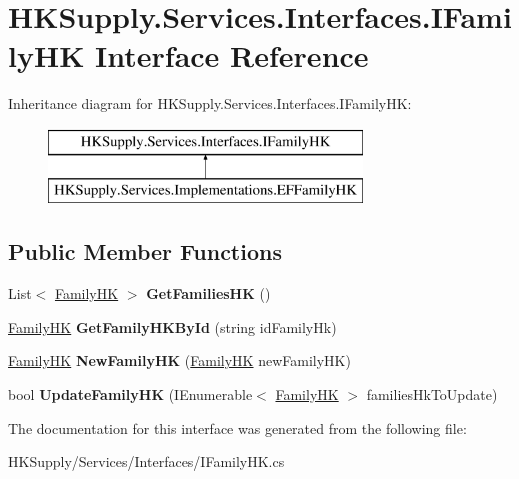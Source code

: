 \hypertarget{interface_h_k_supply_1_1_services_1_1_interfaces_1_1_i_family_h_k}{}\section{H\+K\+Supply.\+Services.\+Interfaces.\+I\+Family\+HK Interface Reference}
\label{interface_h_k_supply_1_1_services_1_1_interfaces_1_1_i_family_h_k}
Inheritance diagram for H\+K\+Supply.\+Services.\+Interfaces.\+I\+Family\+HK\+:\begin{figure}[H]
\begin{center}
\leavevmode
\includegraphics[height=2.000000cm]{interface_h_k_supply_1_1_services_1_1_interfaces_1_1_i_family_h_k}
\end{center}
\end{figure}
\subsection*{Public Member Functions}
\begin{DoxyCompactItemize}
\item 
\mbox{\label{interface_h_k_supply_1_1_services_1_1_interfaces_1_1_i_family_h_k_a498a480fe81de602f0fd3cedcde3658e}} 
List$<$ \mbox{\hyperlink{class_h_k_supply_1_1_models_1_1_family_h_k}{Family\+HK}} $>$ {\bfseries Get\+Families\+HK} ()
\item 
\mbox{\label{interface_h_k_supply_1_1_services_1_1_interfaces_1_1_i_family_h_k_ae53fdf1e7f8544d2465811148ed4f8c2}} 
\mbox{\hyperlink{class_h_k_supply_1_1_models_1_1_family_h_k}{Family\+HK}} {\bfseries Get\+Family\+H\+K\+By\+Id} (string id\+Family\+Hk)
\item 
\mbox{\label{interface_h_k_supply_1_1_services_1_1_interfaces_1_1_i_family_h_k_a4d9b68dde602a2971ec0d44b495a05fc}} 
\mbox{\hyperlink{class_h_k_supply_1_1_models_1_1_family_h_k}{Family\+HK}} {\bfseries New\+Family\+HK} (\mbox{\hyperlink{class_h_k_supply_1_1_models_1_1_family_h_k}{Family\+HK}} new\+Family\+HK)
\item 
\mbox{\label{interface_h_k_supply_1_1_services_1_1_interfaces_1_1_i_family_h_k_a9f394c2a3051c5a38370448b2f603295}} 
bool {\bfseries Update\+Family\+HK} (I\+Enumerable$<$ \mbox{\hyperlink{class_h_k_supply_1_1_models_1_1_family_h_k}{Family\+HK}} $>$ families\+Hk\+To\+Update)
\end{DoxyCompactItemize}


The documentation for this interface was generated from the following file\+:\begin{DoxyCompactItemize}
\item 
H\+K\+Supply/\+Services/\+Interfaces/I\+Family\+H\+K.\+cs\end{DoxyCompactItemize}
